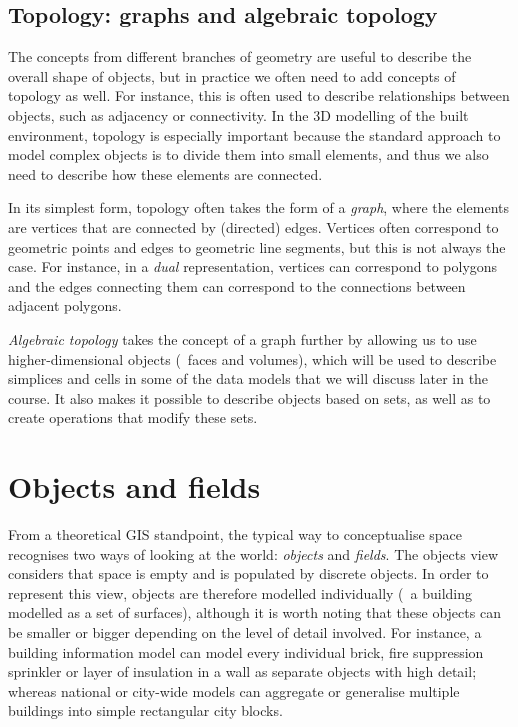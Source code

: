 \subsection{Topology: graphs and algebraic topology}

The concepts from different branches of geometry are useful to describe the overall shape of objects, but in practice we often need to add concepts of topology as well.
For instance, this is often used to describe relationships between objects, such as adjacency or connectivity.
In the 3D modelling of the built environment, topology is especially important because the standard approach to model complex objects is to divide them into small elements, and thus we also need to describe how these elements are connected.

In its simplest form, topology often takes the form of a \emph{graph}, where the elements are vertices that are connected by (directed) edges.
Vertices often correspond to geometric points and edges to geometric line segments, but this is not always the case.
For instance, in a \emph{dual} representation, vertices can correspond to polygons and the edges connecting them can correspond to the connections between adjacent polygons.

\emph{Algebraic topology} takes the concept of a graph further by allowing us to use higher-dimensional objects (\eg\ faces and volumes), which will be used to describe simplices and cells in some of the data models that we will discuss later in the course.
It also makes it possible to describe objects based on sets, as well as to create operations that modify these sets.

\section{Objects and fields}

From a theoretical GIS standpoint, the typical way to conceptualise space recognises two ways of looking at the world: \emph{objects} and \emph{fields}.
The objects view considers that space is empty and is populated by discrete objects.
In order to represent this view, objects are therefore modelled individually (\eg\ a building modelled as a set of surfaces), although it is worth noting that these objects can be smaller or bigger depending on the level of detail involved.
For instance, a building information model can model every individual brick, fire suppression sprinkler or layer of insulation in a wall as separate objects with high detail; whereas national or city-wide models can aggregate or generalise multiple buildings into simple rectangular city blocks.


